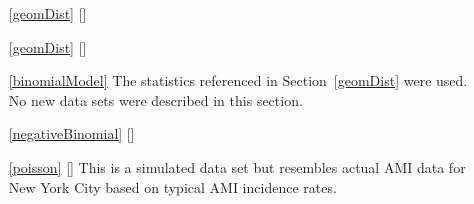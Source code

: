 \begin{itemize}
\item[\ref{geomDist}]
    [\datalink{}]
\item[\ref{geomDist}]
    [\datalink{}]

\item[\ref{binomialModel}]
    The statistics referenced in Section~\ref{geomDist} were used.
    No new data sets were described in this section.
    
\item[\ref{negativeBinomial}]
    [\datalink{}]

\item[\ref{poisson}]
    [\datalink{ami\_occurrences}]
    This is a simulated data set but resembles actual
    AMI data for New York City based on typical AMI
    incidence rates.
\end{itemize}








\section{}
\label{ch_foundations_for_inf_data}

